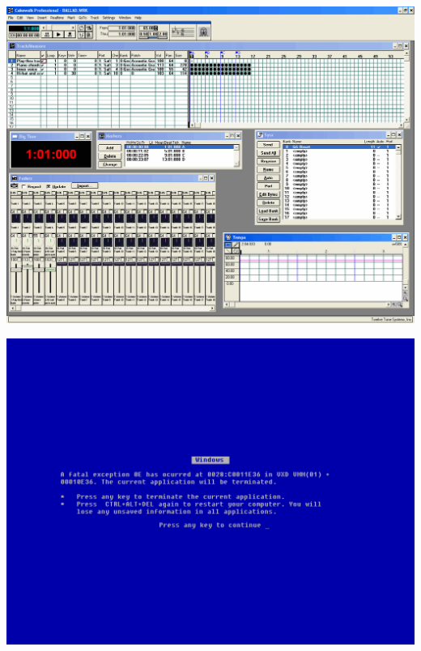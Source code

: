 \documentclass{beamer}
\begin{document}
\begin{frame}
  \begin{center}
    \includegraphics[scale=0.25]{images/cakewalk.png}
  \end{center}
\end{frame}

\begin{frame}
  \begin{center}
    \includegraphics[scale=0.30]{images/Windows_9x_Blue_Screen_of_Death_recreated_in_Fixedsys.png}
  \end{center}
\end{frame}
\end{document}
